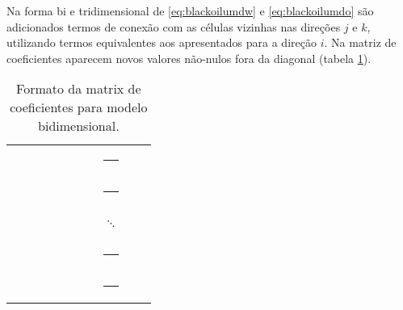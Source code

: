 \documentclass[final,5p]{elsarticle}
\numberwithin{equation}{section}
\begin{document}
        Na forma bi e tridimensional de \ref{eq:blackoilumdw} e \ref{eq:blackoilumdo} são adicionados termos de conexão com as células vizinhas nas direções $j$ e $k$, utilizando termos equivalentes aos apresentados para a direção $i$. Na matriz de coeficientes aparecem novos valores não-nulos fora da diagonal (tabela \ref{tab:bidimensional}).
        \begin{table}
            \centering
            \caption{Formato da matrix de coeficientes para modelo bidimensional.}
            \label{tab:bidimensional}
            \bigskip
            \renewcommand{\arraystretch}{0.8}
            \begin{tabular}{|cccccccccc|}
                \textcolor{black}{\rule{0.5em}{0.5em}} & \textcolor{black}{\rule{0.5em}{0.5em}} & \textcolor{gray}{\rule{0.5em}{0.5em}}  & \textcolor{white}{\rule{0.5em}{0.5em}} & \textcolor{white}{\rule{0.5em}{0.5em}} & \textcolor{white}{\rule{0.5em}{0.5em}} & \textcolor{gray}{\rule{0.5em}{0.5em}}  & \textcolor{white}{\rule{0.5em}{0.5em}} & \textcolor{white}{\rule{0.5em}{0.5em}} & \textcolor{white}{\rule{0.5em}{0.5em}}  \\
                \textcolor{black}{\rule{0.5em}{0.5em}} & \textcolor{black}{\rule{0.5em}{0.5em}} & \textcolor{gray}{\rule{0.5em}{0.5em}}  & \textcolor{white}{\rule{0.5em}{0.5em}} & \textcolor{white}{\rule{0.5em}{0.5em}} & \textcolor{white}{\rule{0.5em}{0.5em}} & \textcolor{gray}{\rule{0.5em}{0.5em}}  & \textcolor{white}{\rule{0.5em}{0.5em}} & \textcolor{white}{\rule{0.5em}{0.5em}} & \textcolor{white}{\rule{0.5em}{0.5em}}  \\
                \textcolor{gray}{\rule{0.5em}{0.5em}}  & \textcolor{white}{\rule{0.5em}{0.5em}} & \textcolor{black}{\rule{0.5em}{0.5em}} & \textcolor{black}{\rule{0.5em}{0.5em}} & \textcolor{gray}{\rule{0.5em}{0.5em}}  & \textcolor{white}{\rule{0.5em}{0.5em}} & \textcolor{white}{\rule{0.5em}{0.5em}} &  $\ddots$                              & \textcolor{white}{\rule{0.5em}{0.5em}} & \textcolor{white}{\rule{0.5em}{0.5em}}  \\
                \textcolor{gray}{\rule{0.5em}{0.5em}}  & \textcolor{white}{\rule{0.5em}{0.5em}} & \textcolor{black}{\rule{0.5em}{0.5em}} & \textcolor{black}{\rule{0.5em}{0.5em}} & \textcolor{gray}{\rule{0.5em}{0.5em}}  & \textcolor{white}{\rule{0.5em}{0.5em}} & \textcolor{white}{\rule{0.5em}{0.5em}} & \textcolor{white}{\rule{0.5em}{0.5em}} & \textcolor{white}{\rule{0.5em}{0.5em}} & \textcolor{white}{\rule{0.5em}{0.5em}}  \\
                \textcolor{white}{\rule{0.5em}{0.5em}} & \textcolor{white}{\rule{0.5em}{0.5em}} & \textcolor{gray}{\rule{0.5em}{0.5em}}  & \textcolor{white}{\rule{0.5em}{0.5em}} & \textcolor{black}{\rule{0.5em}{0.5em}} & \textcolor{black}{\rule{0.5em}{0.5em}} & \textcolor{gray}{\rule{0.5em}{0.5em}}  & \textcolor{white}{\rule{0.5em}{0.5em}} & \textcolor{white}{\rule{0.5em}{0.5em}} & \textcolor{white}{\rule{0.5em}{0.5em}}  \\

\end{tabular}
\end{table}
\end{document}
